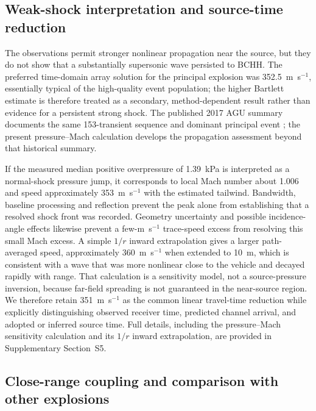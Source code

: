 \documentclass[]{seismica}
\begin{document}
\subsection{Weak-shock interpretation and source-time reduction}

The observations permit stronger nonlinear propagation near the source, but
they do not show that a substantially supersonic wave persisted to BCHH. The
preferred time-domain array solution for the principal explosion was
352.5~m~s$^{-1}$, essentially typical of the high-quality event population;
the higher Bartlett estimate is therefore treated as a secondary,
method-dependent result rather than evidence for a persistent strong shock.
The published 2017 AGU summary documents the same 153-transient sequence and
dominant principal event \citep{thompson_agu_falcon9_2017}; the present
pressure--Mach calculation develops the propagation assessment beyond that
historical summary.

If the measured median positive overpressure of 1.39~kPa is interpreted as
a normal-shock pressure jump, it corresponds to local Mach number about 1.006
and speed approximately 353~m~s$^{-1}$ with the estimated tailwind. Bandwidth,
baseline processing and reflection prevent the peak alone from establishing
that a resolved shock front was recorded. Geometry uncertainty and possible
incidence-angle effects likewise prevent a few-m~s$^{-1}$ trace-speed excess
from resolving this small Mach excess. A simple $1/r$ inward extrapolation gives a larger
path-averaged speed, approximately 360~m~s$^{-1}$ when extended to 10~m, which
is consistent with a wave that was more nonlinear close to the vehicle and
decayed rapidly with range. That calculation is a sensitivity model, not a
source-pressure inversion, because far-field spreading is not guaranteed in
the near-source region. We therefore retain 351~m~s$^{-1}$ as the common linear
travel-time reduction while explicitly distinguishing observed receiver time,
predicted channel arrival, and adopted or inferred source time. Full details,
including the pressure--Mach sensitivity calculation and its $1/r$ inward
extrapolation, are provided in Supplementary Section~S5.

\subsection{Close-range coupling and comparison with other explosions}
\end{document}
